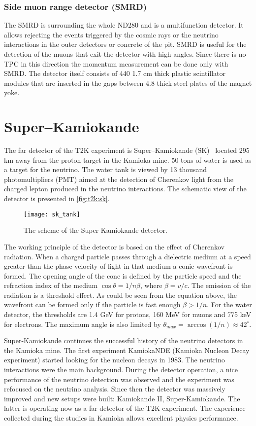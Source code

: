 \documentclass[../main.tex]{subfiles}
\begin{document}
\subsubsection{Side muon range detector (SMRD)}
The SMRD is surrounding the whole ND280 and is a multifunction detector. It allows rejecting the events triggered by the cosmic rays or the neutrino interactions in the outer detectors or concrete of the pit. SMRD is useful for the detection of the muons that exit the detector with high angles. Since there is no TPC in this direction the momentum measurement can be done only with SMRD. The detector itself consists of 440 1.7 cm thick plastic scintillator modules that are inserted in the gaps between 4.8 thick steel plates of the magnet yoke.


\section{Super--Kamiokande}
\label{sec:T2K:sk}
The far detector of the T2K experiment is Super--Kamiokande (SK)~\cite{Fukuda2003} located 295 km away from the proton target in the Kamioka mine. 50 tons of water is used as a target for the neutrino. The water tank is viewed by 13 thousand photomultipliers (PMT) aimed at the detection of Cherenkov light from the charged lepton produced in the neutrino interactions. The schematic view of the detector is presented in \autoref{fig:t2k:sk}.

\begin{figure}[!ht]
  \centering
  \texttt{[image: sk\_tank]}
  \caption{The scheme of the Super-Kamiokande detector.}
  \label{fig:t2k:sk}
\end{figure}

The working principle of the detector is based on the effect of Cherenkov radiation. When a charged particle passes through a dielectric medium at a speed greater than the phase velocity of light in that medium a conic wavefront is formed. The opening angle of the cone is defined by the particle speed and the refraction index of the medium $\cos{\theta}=1/n\beta$, where $\beta=v/c$. The emission of the radiation is a threshold effect. As could be seen from the equation above, the wavefront can be formed only if the particle is fast enough $\beta>1/n$. For the water detector, the thresholds are 1.4 GeV for protons, 160 MeV for muons and 775 keV for electrons. The maximum angle is also limited by $\theta_{max}=\arccos(1/n)\approx42^\circ$.

Super-Kamiokande continues the successful history of the neutrino detectors in the Kamioka mine. The first experiment KamiokaNDE (Kamioka Nucleon Decay experiment) started looking for the nucleon decays in 1983. The neutrino interactions were the main background. During the detector operation, a nice performance of the neutrino detection was observed and the experiment was refocused on the neutrino analysis. Since then the detector was massively improved and new setups were built: Kamiokande II, Super-Kamiokande. The latter is operating now as a far detector of the T2K experiment. The experience collected during the studies in Kamioka allows excellent physics performance.
\end{document}
